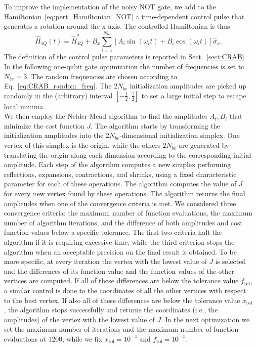 \documentclass[../main/main.tex]{subfiles}
\begin{document}
\vspace{0.5cm}
To improve the implementation of the noisy NOT gate, we add to the Hamiltonian~\eqref{eq:pert_Hamiltonian_NOT} a time-dependent control pulse that generates a rotation around the x-axis. The controlled Hamiltonian is thus
\begin{equation} \label{eq:ctrl_Hamiltonian_NOT}
    \hat{H}_{1Q}(t) = \hat{H}^*_{1Q} + B_x \sum_{i=1}^{N_{be}} \left[ A_i \sin(\omega_i t) + B_i \cos(\omega_i t) \right] \hat{\sigma}_x.
\end{equation}
The definition of the control pulse parameters is reported in Sect.~\ref{sect:CRAB}.\\
In the following one-qubit gate optimization the number of frequencies is set to $N_{be}=3$. The random frequencies are chosen according to Eq.~\eqref{eq:CRAB_random_freq}. The $2 N_{be}$ initialization amplitudes are picked up randomly in the (arbitrary) interval $\left[-\frac{1}{2},\frac{1}{2}\right]$ to set a large initial step to escape local minima.\\
We then employ the Nelder-Mead algorithm \cite{nelder_mead_algorithm} to find the amplitudes $A_i,B_i$ that minimize the cost function $J$. The algorithm starts by transforming the initialization amplitudes into the $2 N_{be}$-dimensional initialization simplex. One vertex of this simplex is the origin, while the others $2 N_{be}$ are generated by translating the origin along each dimension according to the corresponding initial amplitude. Each step of the algorithm computes a new simplex performing reflections, expansions, contractions, and shrinks, using a fixed characteristic parameter for each of these operations. The algorithm computes the value of $J$ for every new vertex found by these operations. The algorithm returns the final amplitudes when one of the convergence criteria is met. We considered three convergence criteria: the maximum number of function evaluations, the maximum number of algorithm iterations, and the difference of both amplitudes and cost function values below a specific tolerance. The first two criteria halt the algorithm if it is requiring excessive time, while the third criterion stops the algorithm when an acceptable precision on the final result is obtained. To be more specific, at every iteration the vertex with the lowest value of $J$ is selected and the differences of its function value and the function values of the other vertices are computed. If all of these differences are below the tolerance value $f_{\text{tol}}$, a similar control is done to the coordinates of all the other vertices with respect to the best vertex. If also all of these differences are below the tolerance value $x_{\text{tol}}$, the algorithm stops successfully and returns the coordinates (i.e., the amplitudes) of the vertex with the lowest value of $J$. In the next optimization we set the maximum number of iterations and the maximum number of function evaluations at $1200$, while we fix $x_{\text{tol}}=10^{-4}$ and $f_{\text{tol}}=10^{-4}$. \par
\end{document}
